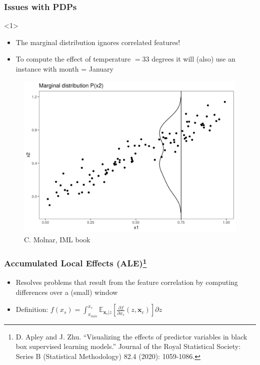 \documentclass{beamer}
\newcommand{\Vx}{\mathbf{x}}
\begin{document}
\begin{frame}
  \frametitle{Issues with PDPs}
  \begin{onlyenv}<1>
    \begin{itemize}
    \item The marginal distribution ignores correlated features!
    \item To compute the effect of temperature $=33$ degrees it will (also) use an instance
        with month = January
    \end{itemize}
    \begin{figure}
      \includegraphics[width=.6\textwidth]{aleplot-motivation1-1}
      \caption{\footnotesize C. Molnar, IML book}
    \end{figure}
  \end{onlyenv}
\end{frame}


\begin{frame}
  \frametitle{Accumulated Local Effects (ALE)\footnote{D. Apley and
    J. Zhu. ``Visualizing the effects of predictor variables in black box
    supervised learning models.'' Journal of the Royal Statistical Society:
    Series B (Statistical Methodology) 82.4 (2020): 1059-1086.}}

  \begin{itemize}
  \item Resolves problems that result from the feature correlation by computing
    differences over a (small) window
  \item Definition: \(f(x_s) = \int_{x_{min}}^{x_s}\mathbb{E}_{\Vx_c|z}[ \frac{\partial f}{\partial x_s}(z, \Vx_c)] \partial z\)
  \end{itemize}
\end{frame}
\end{document}
